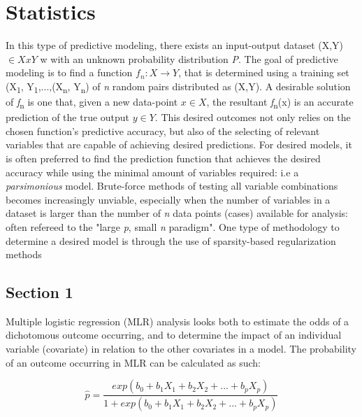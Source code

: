 \cleartooddpage[\thispagestyle{empty}]
\chapter{Statistics}\label{APPENDIXA}

In this type of predictive modeling, there exists an input-output dataset (X,Y) $ \in X x Y$ w with an unknown probability distribution \textit{P}. The goal of predictive modeling is to find a function $f_n : X \rightarrow Y$, that is determined using a training set (X\textsubscript{1}, Y\textsubscript{1},...,(X\textsubscript{n}, Y\textsubscript{n}) of \textit{n} random pairs distributed as (X,Y). A desirable solution of \textit{f}\textsubscript{n} is one that, given a new data-point $x \in X$, the resultant \textit{f}\textsubscript{n}(x) is an accurate prediction of the true output $y \in Y$. This desired outcomes not only relies on the chosen function's predictive accuracy, but also of the selecting of relevant variables that are capable of achieving desired predictions. For desired models, it is often preferred to find the prediction function that achieves the desired accuracy while using the minimal amount of variables required: i.e a \textit{parsimonious} model. Brute-force methods of testing all variable combinations becomes increasingly unviable, especially when the number of variables in a dataset is larger than the number of \textit{n} data points (cases) available for analysis: often refereed to the "large \textit{p}, small \textit{n} paradigm". One type of methodology to determine a desired model is through the use of sparsity-based regularization methods \cite{tibshirani1996regression,frank1993bridge,tibshirani2002diagnosis,zou2005elastic}

\section{Section 1}\label{Mult_log_regression}
Multiple logistic regression (MLR) analysis looks both to estimate the odds of a dichotomous outcome occurring, and to determine the impact of an individual variable (covariate) in relation to the other covariates in a model. The probability of an outcome occurring in MLR can be calculated as such:

\begin{equation}
\hat{p} = \frac{exp(b_0 + b_1 X_1 + b_2 X_2 + ... + b_p X_p)}{1 + exp(b_0 + b_1 X_1 + b_2 X_2 + ... + b_p X_p)}
\end{equation}

